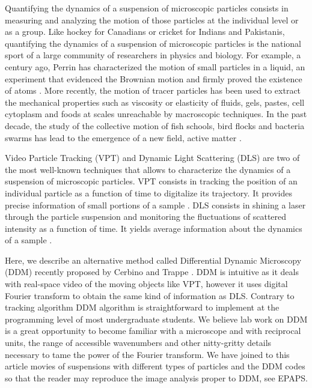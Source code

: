 \documentclass[%
 aip,
 jmp,%
 amsmath,amssymb,
reprint,%
]{revtex4-1}
\begin{document}
Quantifying the dynamics of a suspension of microscopic particles consists in measuring and analyzing the motion of those particles at the individual level or as a group. Like hockey for Canadians or cricket for Indians and Pakistanis, quantifying the dynamics of a suspension of microscopic particles is the national sport of a large community of researchers in physics and biology. For example, a century ago, Perrin has characterized the motion of small particles in a liquid, an experiment that evidenced the Brownian motion and firmly proved the existence of atoms \cite{22_perrin2014atomes}. More recently, the motion of tracer particles has been used to extract the mechanical properties such as viscosity or elasticity of fluids, gels\cite{Mason1997, Chen2010}, pastes, cell cytoplasm\cite{Fabry2001,Lau2003} and foods at scales unreachable by macroscopic techniques. In the past decade, the study of the collective motion of fish schools, bird flocks and bacteria swarms has lead to the emergence of a new field, active matter \cite{Bricard2013}.

Video Particle Tracking (VPT) and Dynamic Light Scattering (DLS) are two of the most well-known techniques that allows to characterize the dynamics of a suspension of microscopic particles. VPT consists in tracking the position of an individual particle as a function of time to digitalize its trajectory. It provides precise information of small portions of a sample \citep{7_jaqaman2008robust}. DLS consists in shining a laser through the particle suspension and monitoring the fluctuations of scattered intensity as a function of time. It yields average information about the dynamics of a sample \citep{18_sartor2003dynamic}.

Here, we describe an alternative method called Differential Dynamic Microscopy (DDM) recently proposed by Cerbino and Trappe \cite{2_DDM}. DDM is intuitive as it deals with real-space video of the moving objects like VPT, however it uses digital Fourier transform to obtain the same kind of information as DLS.  Contrary to tracking algorithm DDM algorithm is straightforward to implement at the programming level of most undergraduate students. We believe lab work on DDM is a great opportunity to become familiar with a microscope and with reciprocal units, the range of accessible wavenumbers and other nitty-gritty details necessary to tame the power of the Fourier transform. We have joined to this article movies of suspensions with different types of particles and the DDM codes so that the reader may reproduce the image analysis proper to DDM, see EPAPS.
\end{document}

